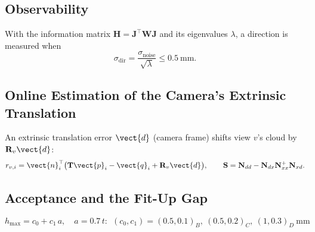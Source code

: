 \subsection{Observability}
With the information matrix $\mathbf{H}=\mathbf{J}^{\top}\mathbf{W}\mathbf{J}$ and its
eigenvalues $\lambda$, a direction is measured when
\begin{equation}
\sigma_{\mathrm{dir}} = \frac{\sigma_{\mathrm{noise}}}{\sqrt{\lambda}} \le 0.5\ \mathrm{mm}.
\label{eq:observability}
\end{equation}

\subsection{Online Estimation of the Camera's Extrinsic Translation}
\label{sec:mv_selfcal}
An extrinsic translation error $\vect{d}$ (camera frame) shifts view $v$'s cloud by
$\mathbf{R}_v\vect{d}$:
\begin{equation}
r_{v,i} = \vect{n}_i^{\top}\big(\mathbf{T}\vect{p}_i - \vect{q}_i + \mathbf{R}_v\vect{d}\big),
\qquad
\mathbf{S} = \mathbf{N}_{dd} - \mathbf{N}_{dx}\mathbf{N}_{xx}^{+}\mathbf{N}_{xd}.
\label{eq:extrinsic_d}
\end{equation}

\subsection{Acceptance and the Fit-Up Gap}
\begin{equation}
h_{\max} = c_0 + c_1\,a,\quad a = 0.7\,t:\ \ (c_0,c_1) = (0.5,0.1)_{B},\ (0.5,0.2)_{C},\ (1,0.3)_{D}\ \mathrm{mm}
\label{eq:iso_gap}
\end{equation}
